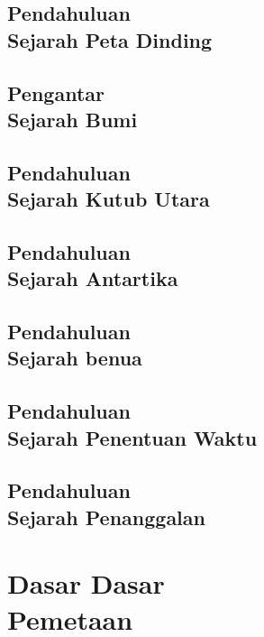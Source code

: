 \documentclass{WileySix}
\begin{document}
\chapter[Sejarah Peta Dinding]
{Pendahuluan\\ Sejarah Peta Dinding}


\chapter[Sejarah Bumi]
{Pengantar\\ Sejarah Bumi}


\chapter[Sejarah Kutub Utara]
{Pendahuluan\\ Sejarah Kutub Utara}


\chapter[Tentang Kutub Selatan]
{Pendahuluan\\ Sejarah Antartika}


\chapter[Sejarah Benua]
{Pendahuluan\\ Sejarah benua}


\chapter[Sejarah Penentuan Waktu]
{Pendahuluan\\ Sejarah Penentuan Waktu}


\chapter[Sejarah Penanggalan]
{Pendahuluan\\ Sejarah  Penanggalan}


\part[Dasar Pemetaan]
{Dasar Dasar\\ Pemetaan}
\end{document}
